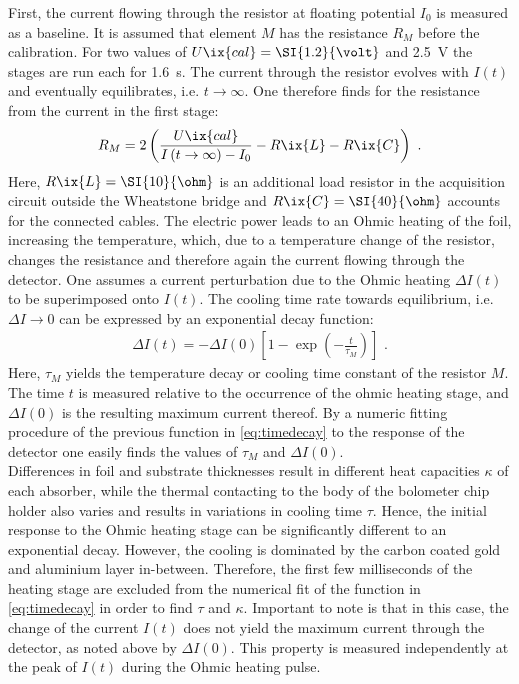 %
                First, the current flowing through the resistor at floating potential $I_{0}$ is measured as a baseline. It is assumed that element $M$ has the resistance $R_{M}$ before the calibration. For two values of $U\ix{cal}=\SI{1.2}{\volt}$ and \SI{2.5}{\volt} the stages are run each for \SI{1.6}{\second}. The current through the resistor evolves with $I\left(t\right)$ and eventually equilibrates, i.e. $t\rightarrow\infty$.
                One therefore finds for the resistance from the current in the first stage:%
%
                \begin{align}%
                    R_{M}=2\left(\frac{U\ix{cal}}{I\left(t\rightarrow\infty\right)-I_{0}}-R\ix{L}-R\ix{C}\right)\,\,.\label{eq:resistance}%
                \end{align}%
%
                Here, $R\ix{L}=\SI{10}{\ohm}$ is an additional load resistor in the acquisition circuit outside the Wheatstone bridge and $R\ix{C}=\SI{40}{\ohm}$ accounts for the connected cables. The electric power leads to an Ohmic heating of the foil, increasing the temperature, which, due to a temperature change of the resistor, changes the resistance and therefore again the current flowing through the detector. One assumes a current perturbation due to the Ohmic heating $\Delta I\left(t\right)$ to be superimposed onto $I\left(t\right)$. The cooling time rate towards equilibrium, i.e. $\Delta I\rightarrow 0$ can be expressed by an exponential decay function:%
%
                \begin{align}%
                    \Delta I\left(t\right)=-\Delta I\left(0\right)\left[1-\exp\left(-\frac{t}{\tau_{M}}\right)\right]\,\,.\label{eq:timedecay}%
                \end{align}%
%
                Here, $\tau_{M}$ yields the temperature decay or cooling time constant of the resistor $M$. The time $t$ is measured relative to the occurrence of the ohmic heating stage, and $\Delta I\left(0\right)$ is the resulting maximum current thereof. By a numeric fitting procedure of the previous function in \cref{eq:timedecay} to the response of the detector one easily finds the values of $\tau_{M}$ and $\Delta I\left(0\right)$.\\%
                Differences in foil and substrate thicknesses result in different heat capacities $\kappa$ of each absorber, while the thermal contacting to the body of the bolometer chip holder also varies and results in variations in cooling time $\tau$. Hence, the initial response to the Ohmic heating stage can be significantly different to an exponential decay. However, the cooling is dominated by the carbon coated gold and aluminium layer in-between. Therefore, the first few milliseconds of the heating stage are excluded from the numerical fit of the function in \cref{eq:timedecay} in order to find $\tau$ and $\kappa$. Important to note is that in this case, the change of the current $I\left(t\right)$ does not yield the maximum current through the detector, as noted above by $\Delta I\left(0\right)$. This property is measured independently at the peak of $I\left(t\right)$ during the Ohmic heating pulse.\\%
